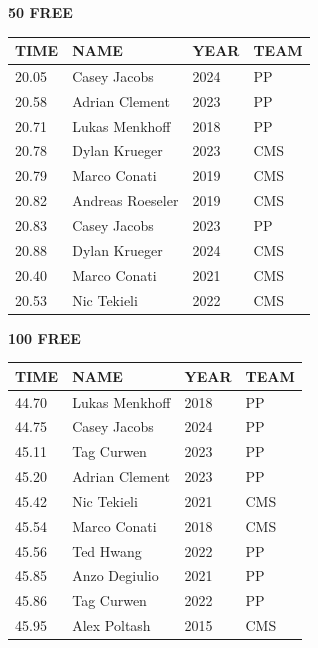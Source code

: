 \begin{table}[H]
\centering
\begin{minipage}[t]{0.48\textwidth}
\centering
\textbf{50 FREE}\\[0.1cm]
\begin{tabular}{@{}p{1.8cm}p{2.8cm}p{1.2cm}p{1.4cm}@{}}
\hline
    \textbf{TIME} & \textbf{NAME} & \textbf{YEAR} & \textbf{TEAM} \\
\hline
    20.05 & Casey Jacobs & 2024 & PP \\
    20.58 & Adrian Clement & 2023 & PP \\
    20.71 & Lukas Menkhoff & 2018 & PP \\
    20.78 & Dylan Krueger & 2023 & CMS \\
    20.79 & Marco Conati & 2019 & CMS \\
    20.82 & Andreas Roeseler & 2019 & CMS \\
    20.83 & Casey Jacobs & 2023 & PP \\
    20.88 & Dylan Krueger & 2024 & CMS \\
    20.40 & Marco Conati & 2021 & CMS \\
    20.53 & Nic Tekieli & 2022 & CMS \\
\hline
\end{tabular}
\end{minipage}\hfill
\begin{minipage}[t]{0.48\textwidth}
\centering
\textbf{100 FREE}\\[0.1cm]
\begin{tabular}{@{}p{1.8cm}p{2.8cm}p{1.2cm}p{1.4cm}@{}}
\hline
    \textbf{TIME} & \textbf{NAME} & \textbf{YEAR} & \textbf{TEAM} \\
\hline
    44.70 & Lukas Menkhoff & 2018 & PP \\
    44.75 & Casey Jacobs & 2024 & PP \\
    45.11 & Tag Curwen & 2023 & PP \\
    45.20 & Adrian Clement & 2023 & PP \\
    45.42 & Nic Tekieli & 2021 & CMS \\
    45.54 & Marco Conati & 2018 & CMS \\
    45.56 & Ted Hwang & 2022 & PP \\
    45.85 & Anzo Degiulio & 2021 & PP \\
    45.86 & Tag Curwen & 2022 & PP \\
    45.95 & Alex Poltash & 2015 & CMS \\
\hline
\end{tabular}
\end{minipage}
\end{table}

